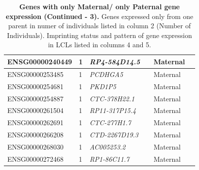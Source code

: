 \begin{table}
\begin{adjustbox}{width={\textwidth}}
\begin{tabular}{@{}p{4cm}p{3cm}p{3cm}p{3cm}p{3cm}p{3cm}@{}}
ENSG00000240449 & 1 & \emph{RP4-584D14.5} & & Maternal &   \\ \hline
ENSG00000253485 & 1 & \emph{PCDHGA5} & &   Maternal &   \\ \hline
ENSG00000254681 & 1 & \emph{PKD1P5} & & Maternal &   \\ \hline
ENSG00000254887 & 1 & \emph{CTC-378H22.1} & & Maternal &   \\ \hline
ENSG00000261504 & 1 & \emph{RP11-317P15.4} & & Maternal &   \\ \hline
ENSG00000262691 & 1 & \emph{CTC-277H1.7} & & Maternal &   \\ \hline
ENSG00000266208 & 1 & \emph{CTD-2267D19.3}& & Maternal &   \\ \hline
ENSG00000268030 & 1 & \emph{AC005253.2} & & Maternal &   \\ \hline
ENSG00000272468 & 1 & \emph{RP1-86C11.7} & & Maternal &   \\ \hline
\end{tabular}
\end{adjustbox}
\caption[Genes with only Maternal/ only Paternal gene expression (Continued - 3). ]{\textbf{Genes with only Maternal/ only Paternal gene expression (Continued - 3).  }Genes expressed only from one parent in numer of individuals listed in column 2 (Number of Individuals). Imprinting status and pattern of gene expression in LCLs listed in columns 4 and 5.}
\label{tab:oneparentexpression4}
\end{table}


